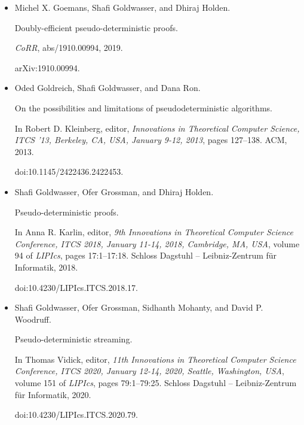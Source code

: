 \begin{itemize}
\item[] 
[14]

Michel X. Goemans, Shafi Goldwasser, and Dhiraj Holden.


Doubly-efficient pseudo-deterministic proofs.


\emph{CoRR}, abs/1910.00994, 2019.


arXiv:1910.00994.





\item[] 
[15]

Oded Goldreich, Shafi Goldwasser, and Dana Ron.


On the possibilities and limitations of pseudodeterministic
algorithms.


In Robert D. Kleinberg, editor, \emph{Innovations in Theoretical
Computer Science, ITCS ’13, Berkeley, CA, USA, January 9-12, 2013}, pages
127–138. ACM, 2013.


doi:10.1145/2422436.2422453.





\item[] 
[16]

Shafi Goldwasser, Ofer Grossman, and Dhiraj Holden.


Pseudo-deterministic proofs.


In Anna R. Karlin, editor, \emph{9th Innovations in Theoretical
Computer Science Conference, ITCS 2018, January 11-14, 2018, Cambridge, MA,
USA}, volume 94 of \emph{LIPIcs}, pages 17:1–17:18. Schloss Dagstuhl –
Leibniz-Zentrum für Informatik, 2018.


doi:10.4230/LIPIcs.ITCS.2018.17.





\item[] 
[17]

Shafi Goldwasser, Ofer Grossman, Sidhanth Mohanty, and David P. Woodruff.


Pseudo-deterministic streaming.


In Thomas Vidick, editor, \emph{11th Innovations in Theoretical
Computer Science Conference, ITCS 2020, January 12-14, 2020, Seattle,
Washington, USA}, volume 151 of \emph{LIPIcs}, pages 79:1–79:25. Schloss
Dagstuhl – Leibniz-Zentrum für Informatik,
2020.


doi:10.4230/LIPIcs.ITCS.2020.79.






\end{itemize}
